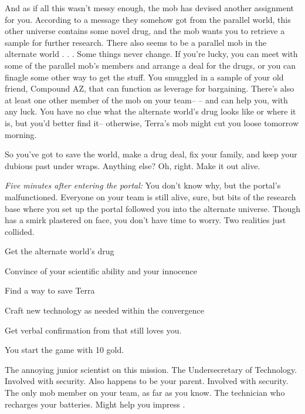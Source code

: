 \documentclass[char]{guildcamp3}
\begin{document}
And as if all this wasn't messy enough, the mob has devised another assignment for you. According to a message they somehow got from the parallel world, this other universe contains some novel drug, and the mob wants you to retrieve a sample for further research. There also seems to be a parallel mob in the alternate world . . . Some things never change. If you're lucky, you can meet with some of the parallel mob's members and arrange a deal for the drugs, or you can finagle some other way to get the stuff. You smuggled in a sample of your old friend, Compound AZ, that can function as leverage for bargaining. There's also at least one other member of the mob on your team-- \cSpecOpTwo{\intro}-- and \cSpecOpTwo{\they} can help you, with any luck. You have no clue what the alternate world's drug looks like or where it is, but you'd better find it-- otherwise, Terra's mob might cut you loose tomorrow morning.

So you've got to save the world, make a drug deal, fix your family, and keep your dubious past under wraps. Anything else? Oh, right. Make it out alive.

\emph{Five minutes after entering the portal:}
You don't know why, but the portal's malfunctioned. Everyone on your team is still alive, sure, but bits of the research base where you set up the portal followed you into the alternate universe. Though \cSciOne{} has a smirk plastered on \cSciOne{\their} face, you don't have time to worry. Two realities just collided.

\begin{itemz}[Goals]
  \item Get the alternate world's drug
  \item Convince \cSciTwo{} of your scientific ability and your innocence
  \item Find a way to save Terra
  \item Craft new technology as needed within the convergence
  \item Get verbal confirmation from \cSpecOpOne{} that \cSpecOpOne{\they} still loves you.
\end{itemz}

\begin{itemz}[Notes]
	\item You start the game with 10 gold. 
\end{itemz}

\begin{contacts}
  \contact{\cSciTwo{}} The annoying junior scientist on this mission.
  \contact{\cPoliTwo{}} The Undersecretary of Technology.
  \contact{\cSpecOpOne{}} Involved with security. Also happens to be your parent.
  \contact{\cSpecOpTwo{}} Involved with security. The only mob member on your team, as far as you know.
  \contact{\cTech{}} The technician who recharges your batteries. Might help you impress \cSciTwo{}.
\end{contacts}
\end{document}
